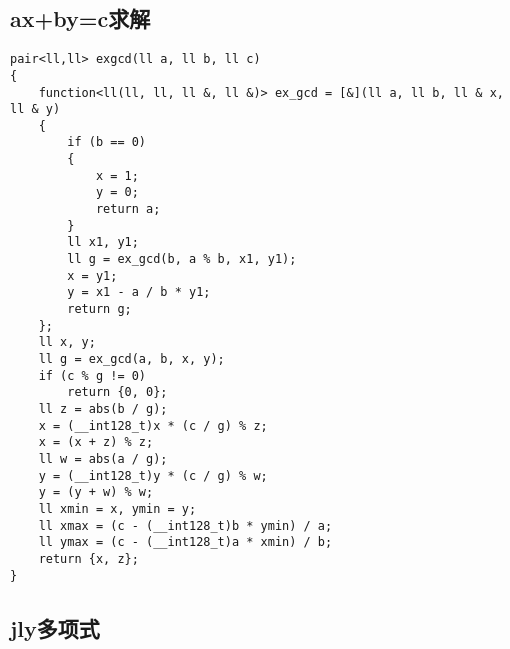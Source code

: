\documentclass[a4paper,10pt]{article}
\begin{document}
\subsection{ax+by=c求解}
\thispagestyle{fancy}

\noindent\begin{lstlisting}
pair<ll,ll> exgcd(ll a, ll b, ll c)
{
    function<ll(ll, ll, ll &, ll &)> ex_gcd = [&](ll a, ll b, ll & x, ll & y)
    {
        if (b == 0)
        {
            x = 1;
            y = 0;
            return a;
        }
        ll x1, y1;
        ll g = ex_gcd(b, a % b, x1, y1);
        x = y1;
        y = x1 - a / b * y1;
        return g;
    };
    ll x, y;
    ll g = ex_gcd(a, b, x, y);
    if (c % g != 0)
        return {0, 0};
    ll z = abs(b / g);
    x = (__int128_t)x * (c / g) % z;
    x = (x + z) % z;
    ll w = abs(a / g);
    y = (__int128_t)y * (c / g) % w;
    y = (y + w) % w;
    ll xmin = x, ymin = y;
    ll xmax = (c - (__int128_t)b * ymin) / a;
    ll ymax = (c - (__int128_t)a * xmin) / b;
    return {x, z};
}\end{lstlisting}

\subsection{jly多项式}
\thispagestyle{fancy}
\end{document}
